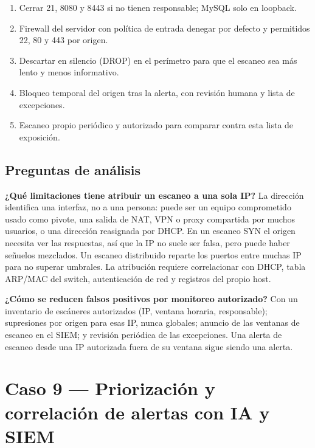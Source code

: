 \begin{enumerate}
  \item Cerrar 21, 8080 y 8443 si no tienen responsable; MySQL solo en loopback.
  \item Firewall del servidor con política de entrada \guillemotleft{}denegar por defecto\guillemotright{} y permitidos 22, 80 y 443 por origen.
  \item Descartar en silencio (DROP) en el perímetro para que el escaneo sea más lento y menos informativo.
  \item Bloqueo temporal del origen tras la alerta, con revisión humana y lista de excepciones.
  \item Escaneo propio periódico y autorizado para comparar contra esta lista de exposición.
\end{enumerate}

\subsection{Preguntas de análisis}

\textbf{¿Qué limitaciones tiene atribuir un escaneo a una sola IP?} La dirección identifica una interfaz, no a una persona: puede ser un equipo comprometido usado como pivote, una salida de NAT, VPN o proxy compartida por muchos usuarios, o una dirección reasignada por DHCP. En un escaneo SYN el origen necesita ver las respuestas, así que la IP no suele ser falsa, pero puede haber señuelos mezclados. Un escaneo distribuido reparte los puertos entre muchas IP para no superar umbrales. La atribución requiere correlacionar con DHCP, tabla ARP/MAC del switch, autenticación de red y registros del propio host.

\textbf{¿Cómo se reducen falsos positivos por monitoreo autorizado?} Con un inventario de escáneres autorizados (IP, ventana horaria, responsable); supresiones por origen para esas IP, nunca globales; anuncio de las ventanas de escaneo en el SIEM; y revisión periódica de las excepciones. Una alerta de escaneo desde una IP autorizada fuera de su ventana sigue siendo una alerta.

\section{Caso 9 --- Priorización y correlación de alertas con IA y SIEM}


